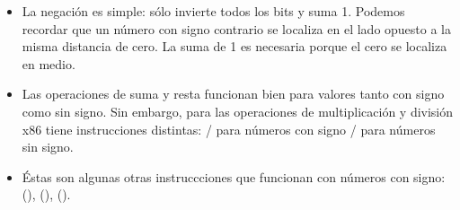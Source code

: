 \begin{itemize}
.

\label{sec:signednumbers:negation}
\item La negaci\'on es simple: s\'olo invierte todos los bits y suma 1.
Podemos recordar que un n\'umero con signo contrario se localiza en el lado opuesto a la misma distancia de cero.
La suma de 1 es necesaria porque el cero se localiza en medio.

\item Las operaciones de suma y resta funcionan bien para valores tanto con signo como sin signo.
	Sin embargo, para las operaciones de multiplicaci\'on y divisi\'on x86 tiene instrucciones distintas:
	/ para n\'umeros con signo \ESph{} / para n\'umeros sin signo.
\item \'Estas son algunas otras instruccciones que funcionan con n\'umeros con signo:
	 (),  (),  ().
\end{itemize}

